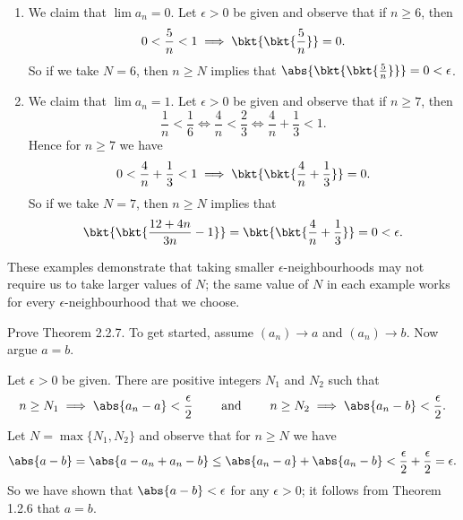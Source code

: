 \documentclass{lew98_solutions}
\begin{document}
\begin{solution}
    \begin{enumerate}
        \item We claim that \( \lim a_n = 0 \). Let \( \epsilon > 0 \) be given and observe that if \( n \geq 6 \), then
        \[
            0 < \frac{5}{n} < 1 \implies \bkt{\bkt{\frac{5}{n}}} = 0.
        \]
        So if we take \( N = 6 \), then \( n \geq N \) implies that \( \abs{\bkt{\bkt{\tfrac{5}{n}}}} = 0 < \epsilon \).

        \item We claim that \( \lim a_n = 1 \). Let \( \epsilon > 0 \) be given and observe that if \( n \geq 7 \), then
        \[
            \frac{1}{n} < \frac{1}{6} \iff \frac{4}{n} < \frac{2}{3} \iff \frac{4}{n} + \frac{1}{3} < 1.
        \]
        Hence for \( n \geq 7 \) we have
        \[
            0 < \frac{4}{n} + \frac{1}{3} < 1 \implies \bkt{\bkt{\frac{4}{n} + \frac{1}{3}}} = 0.
        \]
        So if we take \( N = 7 \), then \( n \geq N \) implies that
        \[
            \bkt{\bkt{\frac{12 + 4n}{3n} - 1}} = \bkt{\bkt{\frac{4}{n} + \frac{1}{3}}} = 0 < \epsilon.
        \]
    \end{enumerate}
    These examples demonstrate that taking smaller \(\epsilon\)-neighbourhoods may not require us to take larger values of \( N \); the same value of \( N \) in each example works for every \(\epsilon\)-neighbourhood that we choose.
\end{solution}

\begin{exercise}
\label{ex:2.2.6}
    Prove Theorem 2.2.7. To get started, assume \( (a_n) \to a \) and \( (a_n) \to b \). Now argue \( a = b \).
\end{exercise}

\begin{solution}
    Let \( \epsilon > 0 \) be given. There are positive integers \( N_1 \) and \( N_2 \) such that
    \[
        n \geq N_1 \implies \abs{a_n - a} < \frac{\epsilon}{2} \hspaceand[8mm] n \geq N_2 \implies \abs{a_n - b} < \frac{\epsilon}{2}.
    \]
    Let \( N = \max \{ N_1, N_2 \} \) and observe that for \( n \geq N \) we have
    \[
        \abs{a - b} = \abs{a - a_n + a_n - b} \leq \abs{a_n - a} + \abs{a_n - b} < \frac{\epsilon}{2} + \frac{\epsilon}{2} = \epsilon.
    \]
    So we have shown that \( \abs{a - b} < \epsilon \) for any \( \epsilon > 0 \); it follows from Theorem 1.2.6 that \( a = b \).
\end{solution}
\end{document}
